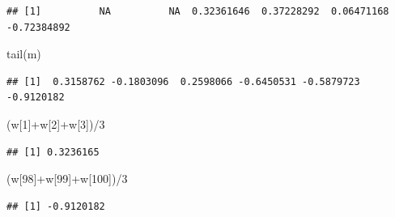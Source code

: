 \documentclass[
]{book}
\newenvironment{Shaded}{\begin{snugshade}}{\end{snugshade}}
\newcommand{\DecValTok}[1]{\textcolor[rgb]{0.00,0.00,0.81}{#1}}
\newcommand{\FunctionTok}[1]{\textcolor[rgb]{0.00,0.00,0.00}{#1}}
\newcommand{\NormalTok}[1]{#1}
\newcommand{\SpecialCharTok}[1]{\textcolor[rgb]{0.00,0.00,0.00}{#1}}
\theoremstyle{definition}
\theoremstyle{definition}
\theoremstyle{definition}
\theoremstyle{definition}
\theoremstyle{remark}
\begin{document}
\begin{verbatim}
## [1]          NA          NA  0.32361646  0.37228292  0.06471168 -0.72384892
\end{verbatim}

\begin{Shaded}
\begin{Highlighting}[]
\FunctionTok{tail}\NormalTok{(m)}
\end{Highlighting}
\end{Shaded}

\begin{verbatim}
## [1]  0.3158762 -0.1803096  0.2598066 -0.6450531 -0.5879723 -0.9120182
\end{verbatim}

\begin{Shaded}
\begin{Highlighting}[]
\NormalTok{(w[}\DecValTok{1}\NormalTok{]}\SpecialCharTok{+}\NormalTok{w[}\DecValTok{2}\NormalTok{]}\SpecialCharTok{+}\NormalTok{w[}\DecValTok{3}\NormalTok{])}\SpecialCharTok{/}\DecValTok{3}
\end{Highlighting}
\end{Shaded}

\begin{verbatim}
## [1] 0.3236165
\end{verbatim}

\begin{Shaded}
\begin{Highlighting}[]
\NormalTok{(w[}\DecValTok{98}\NormalTok{]}\SpecialCharTok{+}\NormalTok{w[}\DecValTok{99}\NormalTok{]}\SpecialCharTok{+}\NormalTok{w[}\DecValTok{100}\NormalTok{])}\SpecialCharTok{/}\DecValTok{3}
\end{Highlighting}
\end{Shaded}

\begin{verbatim}
## [1] -0.9120182
\end{verbatim}
\end{document}
